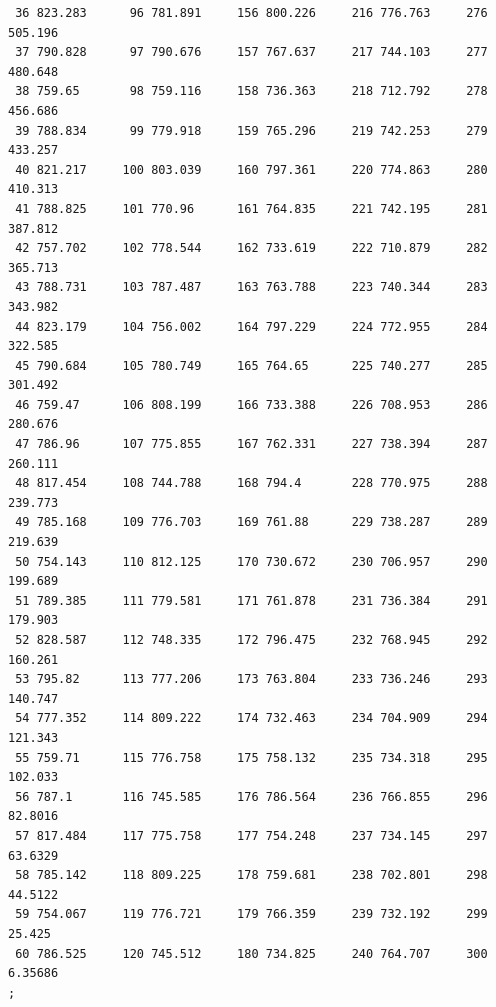 \documentclass{article}
\begin{document}
\begin{verbatim}
 36 823.283      96 781.891     156 800.226     216 776.763     276 505.196
 37 790.828      97 790.676     157 767.637     217 744.103     277 480.648
 38 759.65       98 759.116     158 736.363     218 712.792     278 456.686
 39 788.834      99 779.918     159 765.296     219 742.253     279 433.257
 40 821.217     100 803.039     160 797.361     220 774.863     280 410.313
 41 788.825     101 770.96      161 764.835     221 742.195     281 387.812
 42 757.702     102 778.544     162 733.619     222 710.879     282 365.713
 43 788.731     103 787.487     163 763.788     223 740.344     283 343.982
 44 823.179     104 756.002     164 797.229     224 772.955     284 322.585
 45 790.684     105 780.749     165 764.65      225 740.277     285 301.492
 46 759.47      106 808.199     166 733.388     226 708.953     286 280.676
 47 786.96      107 775.855     167 762.331     227 738.394     287 260.111
 48 817.454     108 744.788     168 794.4       228 770.975     288 239.773
 49 785.168     109 776.703     169 761.88      229 738.287     289 219.639
 50 754.143     110 812.125     170 730.672     230 706.957     290 199.689
 51 789.385     111 779.581     171 761.878     231 736.384     291 179.903
 52 828.587     112 748.335     172 796.475     232 768.945     292 160.261
 53 795.82      113 777.206     173 763.804     233 736.246     293 140.747
 54 777.352     114 809.222     174 732.463     234 704.909     294 121.343
 55 759.71      115 776.758     175 758.132     235 734.318     295 102.033
 56 787.1       116 745.585     176 786.564     236 766.855     296  82.8016
 57 817.484     117 775.758     177 754.248     237 734.145     297  63.6329
 58 785.142     118 809.225     178 759.681     238 702.801     298  44.5122
 59 754.067     119 776.721     179 766.359     239 732.192     299  25.425
 60 786.525     120 745.512     180 734.825     240 764.707     300   6.35686
;


\end{verbatim}
\end{document}
